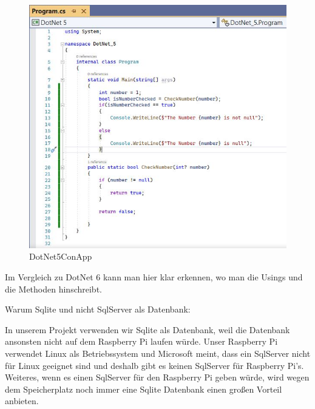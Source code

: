 \begin{figure}[H]
    \centering
    \includegraphics[width=1\textwidth]{./pics/DotNet5ConApp.JPG}
    \caption{DotNet5ConApp}
\end{figure}


Im Vergleich zu DotNet 6 kann man hier klar erkennen, wo man die Usings und die Methoden hinschreibt.




Warum Sqlite und nicht SqlServer als Datenbank:

In unserem Projekt verwenden wir Sqlite als Datenbank, weil die Datenbank ansonsten nicht auf dem Raspberry Pi laufen würde.
Unser Raspberry Pi verwendet Linux als Betriebssystem und Microsoft meint, dass ein SqlServer nicht für Linux geeignet sind und deshalb gibt es keinen SqlServer für Raspberry Pi's.
Weiteres, wenn es einen SqlServer für den Raspberry Pi geben würde, wird wegen dem Speicherplatz noch immer eine Sqlite Datenbank einen großen Vorteil anbieten.






